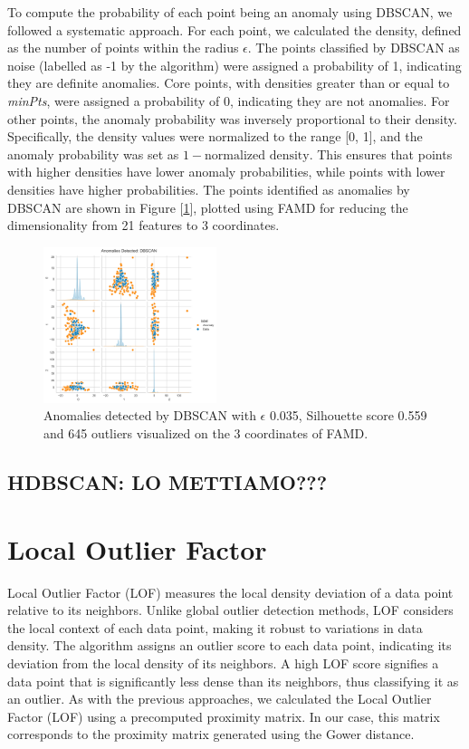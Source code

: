 \documentclass[a4paper]{article}
\begin{document}
To compute the probability of each point being an anomaly using DBSCAN, we followed a systematic approach. For each point, we calculated the density, defined as the number of points within the radius $\epsilon$. The points classified by DBSCAN as noise (labelled as -1 by the algorithm) were assigned a probability of 1, indicating they are definite anomalies. Core points, with densities greater than or equal to \textit{minPts}, were assigned a probability of 0, indicating they are not anomalies. \newline
For other points, the anomaly probability was inversely proportional to their density. Specifically, the density values were normalized to the range [0, 1], and the anomaly probability was set as $1 - \text{normalized density}$. This ensures that points with higher densities have lower anomaly probabilities, while points with lower densities have higher probabilities.
The points identified as anomalies by DBSCAN are shown in Figure [\ref{fig:famd_dbscan}], plotted using FAMD for reducing the dimensionality from 21 features to 3 coordinates.

\begin{figure}
    \centering
    \includegraphics[width=0.45\textwidth]{images/famd_dbscan.png}
    \caption{Anomalies detected by DBSCAN with $\epsilon$ 0.035, Silhouette score 0.559 and 645 outliers visualized on the 3 coordinates of FAMD.}
    \label{fig:famd_dbscan}
\end{figure}

\subsection{HDBSCAN: LO METTIAMO???}

\section{Local Outlier Factor}
Local Outlier Factor (LOF) measures the local density deviation of a data point relative to its neighbors. Unlike global outlier detection methods, LOF considers the local context of each data point, making it robust to variations in data density. The algorithm assigns an outlier score to each data point, indicating its deviation from the local density of its neighbors. A high LOF score signifies a data point that is significantly less dense than its neighbors, thus classifying it as an outlier. \newline
As with the previous approaches, we calculated the Local Outlier Factor (LOF) using a precomputed proximity matrix. In our case, this matrix corresponds to the proximity matrix generated using the Gower distance.
\end{document}
